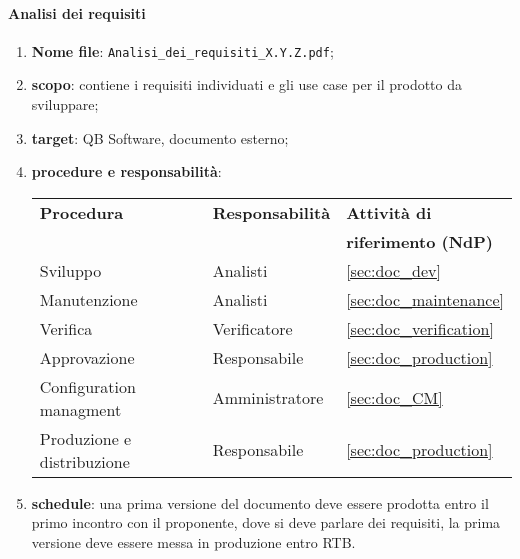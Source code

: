         \paragraph{Analisi dei requisiti}
            \begin{enumerate}
                \item \textbf{Nome file}: \texttt{Analisi\_dei\_requisiti\_X.Y.Z.pdf};
                \item \textbf{scopo}: contiene i requisiti individuati e gli use case per il prodotto da sviluppare;
                \item \textbf{target}: QB Software, documento esterno;
                \item \textbf{procedure e responsabilità}:
                    \newline
                    \begin{tabularx}{0.93\textwidth}{|X|X|X|}
                        \hline
                        \textbf{Procedura} & \textbf{Responsabilità} & \textbf{Attività di} \\
                        & & \textbf{riferimento (NdP)} \\
                        \hline
                        Sviluppo & Analisti & \ref{sec:doc_dev}
                        \\\hline
                        Manutenzione & Analisti & \ref{sec:doc_maintenance}
                        \\\hline
                        Verifica & Verificatore & \ref{sec:doc_verification}
                        \\\hline
                        Approvazione & Responsabile & \ref{sec:doc_production}
                        \\\hline
                        Configuration managment & Amministratore & \ref{sec:doc_CM}
                        \\\hline
                        Produzione e distribuzione & Responsabile & \ref{sec:doc_production}
                        \\\hline
                    \end{tabularx}
                \item \textbf{schedule}: una prima versione del documento deve essere prodotta entro il primo incontro con il proponente, dove si deve parlare dei requisiti, la prima versione deve essere messa in produzione entro RTB.
            \end{enumerate} 

